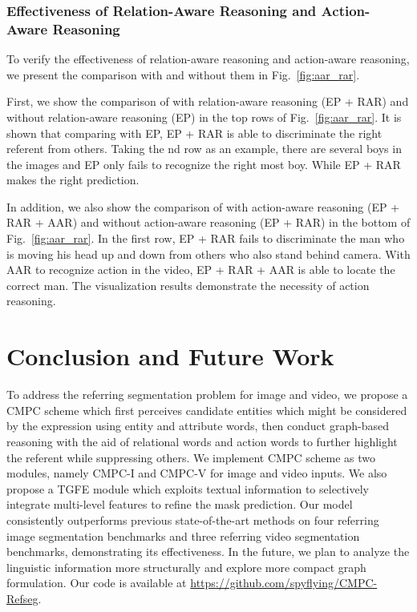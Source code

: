 \documentclass[10pt,journal,cspaper,compsoc]{IEEEtran}
\begin{document}
\subsubsection{Effectiveness of Relation-Aware Reasoning and Action-Aware Reasoning}
To verify the effectiveness of relation-aware reasoning and action-aware reasoning, we present the comparison with and without them in Fig.~\ref{fig:aar_rar}.

First, we show the comparison of with relation-aware reasoning (EP + RAR) and without relation-aware reasoning (EP) in the top rows of Fig.~\ref{fig:aar_rar}. It is shown that comparing with EP, EP + RAR is able to discriminate the right referent from others. Taking the nd row as an example, there are several boys in the images and EP only fails to recognize the right most boy. While EP + RAR makes the right prediction.

In addition, we also show the comparison of with action-aware reasoning (EP + RAR + AAR) and without action-aware reasoning (EP + RAR) in the bottom of Fig.~\ref{fig:aar_rar}. In the first row, EP + RAR fails to discriminate the man who is moving his head up and down from others who also stand behind camera. With AAR to recognize action in the video, EP + RAR + AAR is able to locate the correct man. The visualization results demonstrate the necessity of action reasoning.

\section{Conclusion and Future Work}

To address the referring segmentation problem for image and video, we propose a CMPC scheme which first perceives candidate entities which might be considered by the expression using entity and attribute words, then conduct graph-based reasoning with the aid of relational words and action words to further highlight the referent while suppressing others. 
We implement CMPC scheme as two modules, namely CMPC-I and CMPC-V for image and video inputs. 
We also propose a TGFE module which exploits textual information to selectively integrate multi-level features to refine the mask prediction. 
Our model consistently outperforms previous state-of-the-art methods on four referring image segmentation benchmarks and three referring video segmentation benchmarks, demonstrating its effectiveness. 
In the future, we plan to analyze the linguistic information more structurally and explore more compact graph formulation. 
Our code is available at \url{https://github.com/spyflying/CMPC-Refseg}.




\end{document}

